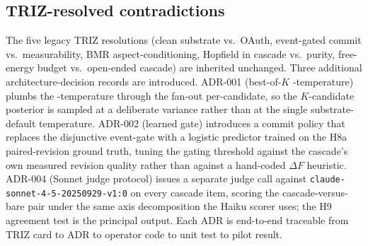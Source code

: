 \subsection{TRIZ-resolved contradictions}

The five legacy TRIZ resolutions (clean substrate vs.\ OAuth, event-gated commit vs.\ measurability, BMR aspect-conditioning, Hopfield in cascade vs.\ purity, free-energy budget vs.\ open-ended cascade) are inherited unchanged. Three additional architecture-decision records are introduced. ADR-001 (best-of-$K$ -temperature) plumbs the -temperature through the  fan-out per-candidate, so the $K$-candidate posterior is sampled at a deliberate variance rather than at the single substrate-default temperature. ADR-002 (learned gate) introduces a commit policy that replaces the disjunctive event-gate with a logistic predictor trained on the H8a paired-revision ground truth, tuning the gating threshold against the cascade's own measured revision quality rather than against a hand-coded $\Delta F$ heuristic. ADR-004 (Sonnet judge protocol) issues a separate judge call against \texttt{claude-sonnet-4-5-20250929-v1:0} on every cascade item, scoring the cascade-versus-bare pair under the same axis decomposition the Haiku scorer uses; the H9 agreement test is the principal output. Each ADR is end-to-end traceable from TRIZ card to ADR to operator code to unit test to pilot result.
